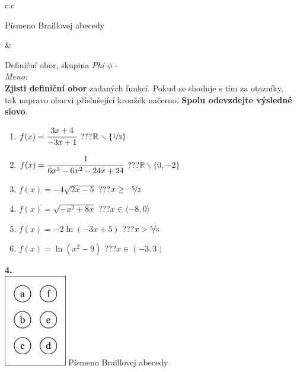 \documentclass[10pt]{report}
\begin{document}
\begin{tabular}{c:c}
\begin{minipage}[c][99mm][t]{0.49\linewidth}
\begin{center}
\begin{minipage}{0.20\linewidth}
\begin{center}
{\small Písmeno Braillovej abecedy}
\end{center}
\end{minipage}
\end{center}
\end{minipage}
&
\begin{minipage}[c][99mm][t]{0.49\linewidth}
\begin{center}
\vspace{7mm}
{\huge Definiční obor, skupina \textit{Phi $\phi$} -}\\[4.5mm]
\textit{Meno:}\phantom{xxxxxxxxxxxxxxxxxxxxxxxxxxxxxxxxxxxxxxxxxxxxxxxxxxxxxxxxxxxxxxxxx}\\[3.5mm]
\textbf{Zjisti definiční obor} zadaných funkcí. Pokud se shoduje s tím za otazníky,\\tak napravo obarvi příslušející kroužek načerno. \textbf{Spolu odevzdejte výsledné slovo}.\\[3mm]
\begin{minipage}{0.77\linewidth}
\begin{center}
\begin{varwidth}{\textwidth}
\begin{enumerate}
\normalsize
\item $f(x)=\cfrac{3x+4}{-3x+1}$\quad \dotfill\; ???\;\dotfill \quad $\mathbb{R}\smallsetminus\{\nicefrac{1}{3}\}$
\item $f(x)=\cfrac{1}{6x^3-6x^2-24x+24}$\quad \dotfill\; ???\;\dotfill \quad $\mathbb{R}\smallsetminus\{0,-2\}$
\item $f(x)=-4\sqrt{2x-5}$\quad \dotfill\; ???\;\dotfill \quad $x\geq\nicefrac{-5}{2}$
\item $f(x)=\sqrt{-x^2+8x}$\quad \dotfill\; ???\;\dotfill \quad $x\in\langle-8 , 0\rangle$
\item $f(x)=-2\ln{(-3x+5)}$\quad \dotfill\; ???\;\dotfill \quad $x>\nicefrac{5}{3}$
\item $f(x)=\ln{(x^2-9)}$\quad \dotfill\; ???\;\dotfill \quad $x\in(-3 , 3)$
\end{enumerate}
\end{varwidth}
\end{center}
\end{minipage}
\begin{minipage}{0.20\linewidth}
\begin{center}
{\Huge\bfseries 4.} \\[2mm]
\includegraphics[height=40mm]{../images/braille.png}
{\small Písmeno Braillovej abecedy}
\end{center}
\end{minipage}
\end{center}
\end{minipage}
%
\end{tabular}
\end{document}
